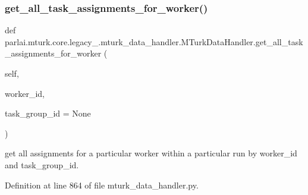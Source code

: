 \subsubsection{\texorpdfstring{get\+\_\+all\+\_\+task\+\_\+assignments\+\_\+for\+\_\+worker()}{get\_all\_task\_assignments\_for\_worker()}}
{\footnotesize\ttfamily def parlai.\+mturk.\+core.\+legacy\+\_.\+mturk\+\_\+data\+\_\+handler.\+M\+Turk\+Data\+Handler.\+get\+\_\+all\+\_\+task\+\_\+assignments\+\_\+for\+\_\+worker (\begin{DoxyParamCaption}\item[{}]{self,  }\item[{}]{worker\+\_\+id,  }\item[{}]{task\+\_\+group\+\_\+id = {\ttfamily None} }\end{DoxyParamCaption})}

\begin{DoxyVerb}get all assignments for a particular worker within a particular run by worker_id
and task_group_id.
\end{DoxyVerb}
 

Definition at line 864 of file mturk\+\_\+data\+\_\+handler.\+py.


